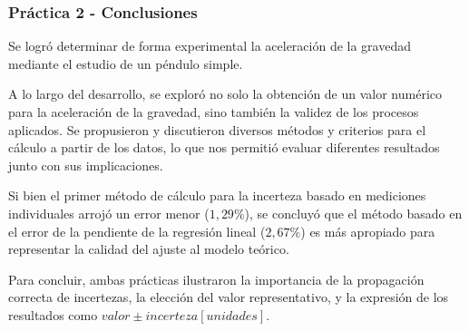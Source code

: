 \subsubsection{Práctica 2 - Conclusiones}

Se logró determinar de forma experimental la aceleración de la gravedad mediante el estudio de un péndulo simple.

A lo largo del desarrollo, se exploró no solo la obtención de un valor numérico para la aceleración de la gravedad, sino también la validez de los procesos aplicados.
Se propusieron y discutieron diversos métodos y criterios para el cálculo a partir de los datos, lo que nos permitió evaluar diferentes resultados junto con sus implicaciones.

Si bien el primer método de cálculo para la incerteza basado en mediciones individuales arrojó un error menor ($1{,}29\%$), se concluyó que el método basado en el error de la pendiente de la regresión lineal ($2{,}67\%$) es más apropiado para representar la calidad del ajuste al modelo teórico.

Para concluir, ambas prácticas ilustraron la importancia de la propagación correcta de incertezas, la elección del valor representativo, y la expresión de los resultados como $valor \pm incerteza [unidades]$.
